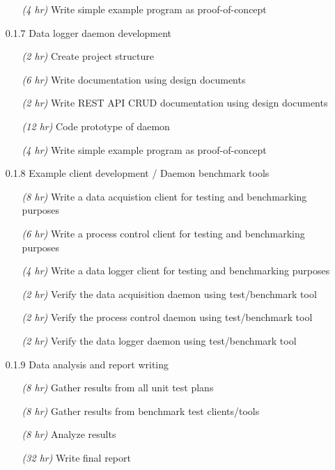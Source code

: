 \documentclass[11pt]{article}
\begin{document}
\begin{itemize}
\begin{itemize}
            \item[\emph{(4 hr)}] Write simple example program as proof-of-concept
          \end{itemize}
        \item[0.1.7] Data logger daemon development
          \begin{itemize}
            \item[\emph{(2 hr)}] Create project structure
            \item[\emph{(6 hr)}] Write documentation using design documents
            \item[\emph{(2 hr)}] Write REST API CRUD documentation using design documents
            \item[\emph{(12 hr)}] Code prototype of daemon
            \item[\emph{(4 hr)}] Write simple example program as proof-of-concept
          \end{itemize}
        \item[0.1.8] Example client development / Daemon benchmark tools
          \begin{itemize}
            \item[\emph{(8 hr)}] Write a data acquistion client for testing and benchmarking purposes
            \item[\emph{(6 hr)}] Write a process control client for testing and benchmarking purposes
            \item[\emph{(4 hr)}] Write a data logger client for testing and benchmarking purposes
            \item[\emph{(2 hr)}] Verify the data acquisition daemon using test/benchmark tool
            \item[\emph{(2 hr)}] Verify the process control daemon using test/benchmark tool
            \item[\emph{(2 hr)}] Verify the data logger daemon using test/benchmark tool
          \end{itemize}
        \item[0.1.9] Data analysis and report writing
          \begin{itemize}
            \item[\emph{(8 hr)}] Gather results from all unit test plans
            \item[\emph{(8 hr)}] Gather results from benchmark test clients/tools
            \item[\emph{(8 hr)}] Analyze results
            \item[\emph{(32 hr)}] Write final report

\end{itemize}
\end{itemize}
\end{document}
